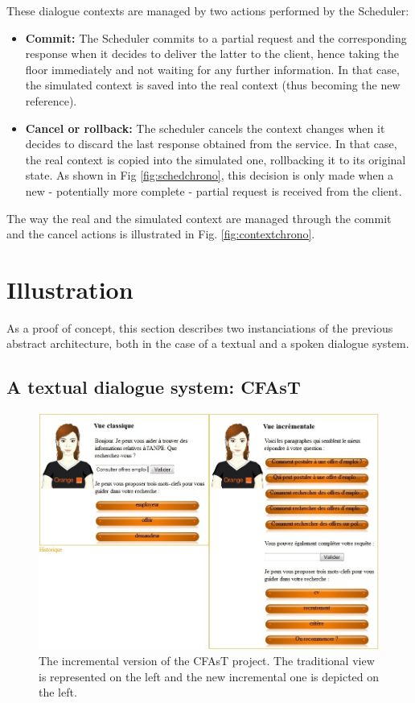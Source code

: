         These dialogue contexts are managed by two actions performed by the Scheduler:
        
        \begin{itemize}
        	\item \textbf{Commit:} The Scheduler commits to a partial request and the corresponding response when it decides to deliver the latter to the client, hence taking the floor immediately and not waiting for any further information. In that case, the simulated context is saved into the real context (thus becoming the new reference).
            \item \textbf{Cancel or rollback:} The scheduler cancels the context changes when it decides to discard the last response obtained from the service. In that case, the real context is copied into the simulated one, rollbacking it to its original state. As shown in Fig \ref{fig:schedchrono}, this decision is only made when a new - potentially more complete - partial request is received from the client.
        \end{itemize}
 
 		The way the real and the simulated context are managed through the commit and the cancel actions is illustrated in Fig. \ref{fig:contextchrono}.

        
\section{Illustration}

        As a proof of concept, this section describes two instanciations of the previous abstract architecture, both in the case of a textual and a spoken dialogue system.

	\subsection{A textual dialogue system: CFAsT}
    
    	\begin{figure}[ht]
          \centering
          \includegraphics[scale=0.6]{figures/CFAsTIncr.jpg}
          \caption{The incremental version of the CFAsT project. The traditional view is represented on the left and the new incremental one is depicted on the left.}
          \label{fig:CFAsTIncr}
        \end{figure}
        
